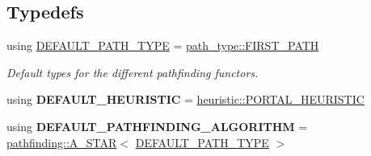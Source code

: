 \subsection*{Typedefs}
\begin{DoxyCompactItemize}
\item 
using \hyperlink{namespaceutil_af14903e1b6bb37af34ff11b799c174a3}{D\+E\+F\+A\+U\+L\+T\+\_\+\+P\+A\+T\+H\+\_\+\+T\+Y\+PE} = \hyperlink{structutil_1_1path__type_1_1_f_i_r_s_t___p_a_t_h}{path\+\_\+type\+::\+F\+I\+R\+S\+T\+\_\+\+P\+A\+TH}
\begin{DoxyCompactList}\small\item\em Default types for the different pathfinding functors. \end{DoxyCompactList}\item 
using {\bfseries D\+E\+F\+A\+U\+L\+T\+\_\+\+H\+E\+U\+R\+I\+S\+T\+IC} = \hyperlink{structutil_1_1heuristic_1_1_p_o_r_t_a_l___h_e_u_r_i_s_t_i_c}{heuristic\+::\+P\+O\+R\+T\+A\+L\+\_\+\+H\+E\+U\+R\+I\+S\+T\+IC}\hypertarget{namespaceutil_a9388080063c93cff1e5941977c770bb9}{}\label{namespaceutil_a9388080063c93cff1e5941977c770bb9}

\item 
using {\bfseries D\+E\+F\+A\+U\+L\+T\+\_\+\+P\+A\+T\+H\+F\+I\+N\+D\+I\+N\+G\+\_\+\+A\+L\+G\+O\+R\+I\+T\+HM} = \hyperlink{structutil_1_1pathfinding_1_1_a___s_t_a_r}{pathfinding\+::\+A\+\_\+\+S\+T\+AR}$<$ \hyperlink{namespaceutil_af14903e1b6bb37af34ff11b799c174a3}{D\+E\+F\+A\+U\+L\+T\+\_\+\+P\+A\+T\+H\+\_\+\+T\+Y\+PE} $>$\hypertarget{namespaceutil_a0cd7acf325c204c043920adce357ae2b}{}\label{namespaceutil_a0cd7acf325c204c043920adce357ae2b}

\end{DoxyCompactItemize}

